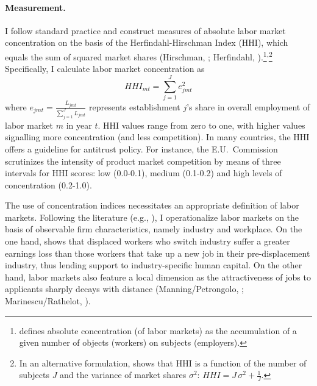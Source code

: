 \documentclass[11pt,oneside,reqno,xcolor=dvipsnames]{article} %
\newcommand\fnsep{\textsuperscript{,}} %
\begin{document}
\paragraph{Measurement.} I follow standard practice and construct measures of absolute labor market concentration on the basis of the Herfindahl-Hirschman Index (HHI), which equals the sum of squared market shares (Hirschman, \citeyear{Hirschman1945}; Herfindahl, \citeyear{Herfindahl1950}).\footnote{\citet{Marfels1971} defines absolute concentration (of labor markets) as the accumulation of a given number of objects (workers) on subjects (employers).}\fnsep\footnote{In an alternative formulation, \citet{Adelman1969} shows that HHI is a function of the number of subjects $J$ and the variance of market shares $\sigma^{2}$: $ H\!H\!I = J \, \sigma^{2} + \frac{1}{J} $.} Specifically, I calculate labor market concentration as
\begin{equation}
\label{eq:1}
H\!H\!I_{mt} = \sum_{j=1}^{J} e_{jmt}^{2}
\end{equation}
where $ e_{jmt} = \frac{L_{jmt}}{\sum_{j=1}^{J} L_{jmt}} $ represents establishment $j$'s share in overall employment of labor market $m$ in year $t$. HHI values range from zero to one, with higher values signalling more concentration (and less competition). In many countries, the HHI offers a guideline for antitrust policy. For instance, the E.U.\ Commission \citeyearpar{EC2004} scrutinizes the intensity of product market competition by means of three intervals for HHI scores: low (0.0-0.1), medium (0.1-0.2) and high levels of concentration (0.2-1.0).

The use of concentration indices necessitates an appropriate definition of labor markets. Following the literature (e.g., \citealp{Rinz2020}), I operationalize labor markets on the basis of observable firm characteristics, namely industry and workplace. On the one hand, \citet{Neal1995} shows that displaced workers who switch industry suffer a greater earnings loss than those workers that take up a new job in their pre-displacement industry, thus lending support to industry-specific human capital. On the other hand, labor markets also feature a local dimension as the attractiveness of jobs to applicants sharply decays with distance (Manning/Petrongolo, \citeyear{ManningPetrongolo2017}; Marinescu/Rathelot, \citeyear{MarinescuRathelot2018}).
\end{document}
